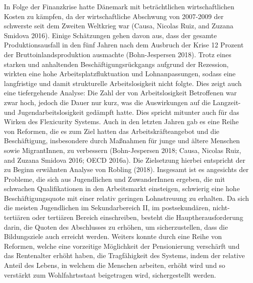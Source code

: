 \documentclass[12pt,]{article}
\begin{document}
In Folge der Finanzkrise hatte Dänemark mit beträchtlichen
wirtschaftlichen Kosten zu kämpfen, da der wirtschaftliche Abschwung von
2007-2009 der schwerste seit dem Zweiten Weltkrieg war (Causa, Nicolas
Ruiz, and Zuzana Smidova 2016). Einige Schätzungen gehen davon aus, dass
der gesamte Produktionsausfall in den fünf Jahren nach dem Ausbruch der
Krise 12 Prozent der Bruttoinlandsproduktion ausmachte (Bohn-Jespersen
2018). Trotz eines starken und anhaltenden Beschäftigungsrückgangs
aufgrund der Rezession, wirkten eine hohe Arbeitsplatzfluktuation und
Lohnanpassungen, sodass eine langfristige und damit strukturelle
Arbeitslosigkeit nicht folgte. Dies zeigt auch eine tiefergehende
Analyse: Die Zahl der von Arbeitslosigkeit Betroffenen war zwar hoch,
jedoch die Dauer nur kurz, was die Auswirkungen auf die Langzeit- und
Jugendarbeitslosigkeit gedämpft hatte. Dies spricht mitunter auch für
das Wirken des Flexicurity Systems. Auch in den letzten Jahren gab es
eine Reihe von Reformen, die es zum Ziel hatten das Arbeitskräfteangebot
und die Beschäftigung, insbesondere durch Maßnahmen für junge und ältere
Menschen sowie MigrantInnen, zu verbessern (Bohn-Jespersen 2018; Causa,
Nicolas Ruiz, and Zuzana Smidova 2016; OECD 2016a). Die Zielsetzung
hierbei entspricht der zu Beginn erwähnten Analyse von Robling (2018).
Insgesamt ist es angesichts der Probleme, die sich aus Jugendlichen und
ZuwanderInnen ergeben, die mit schwachen Qualifikationen in den
Arbeitsmarkt einsteigen, schwierig eine hohe Beschäftigungsquote mit
einer relativ geringen Lohnstreuung zu erhalten. Da sich die meisten
Jugendlichen im Sekundarbereich II, im postsekundären, nicht-tertiären
oder tertiären Bereich einschreiben, besteht die Hauptherausforderung
darin, die Quoten des Abschlusses zu erhöhen, um sicherzustellen, dass
die Bildungsziele auch erreicht werden. Weiters konnte durch eine Reihe
von Reformen, welche eine vorzeitige Möglichkeit der Pensionierung
verschärft und das Rentenalter erhöht haben, die Tragfähigkeit des
Systems, indem der relative Anteil des Lebens, in welchem die Menschen
arbeiten, erhöht wird und so verstärkt zum Wohlfahrtsstaat beigetragen
wird, sichergestellt werden.
\end{document}
